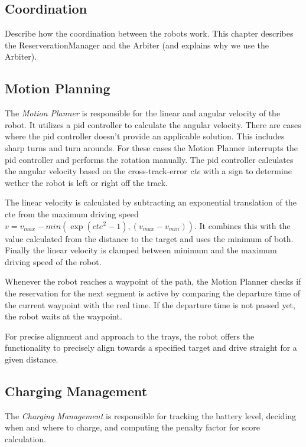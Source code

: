 \documentclass[journal]{IEEEtran}
\begin{document}
\subsection{Coordination}
\label{subsec:coordination}
Describe how the coordination between the robots work. This chapter describes the ReserverationManager and the Arbiter (and explains why we use the Arbiter).

\subsection{Motion Planning}
\label{subsec:motion_planning}
The \emph{Motion Planner} is responsible for the linear and angular velocity of the robot. It utilizes a pid controller to calculate the angular velocity. There are cases where the pid controller doesn't provide an applicable solution. This includes sharp turns and turn arounds. For these cases the Motion Planner interrupts the pid controller and performs the rotation manually. The pid controller calculates the angular velocity based on the cross-track-error \emph{cte} with a sign to determine wether the robot is left or right off the track.

The linear velocity is calculated by subtracting an exponential translation of the cte from the maximum driving speed $v = v_{max} - min(\exp(cte^2-1), (v_{max}-v_{min}))$. It combines this with the value calculated from the distance to the target and uses the minimum of both. Finally the linear velocity is clamped between minimum and the maximum driving speed of the robot.

Whenever the robot reaches a waypoint of the path, the Motion Planner checks if the reservation for the next segment is active by comparing the departure time of the current waypoint with the real time. If the departure time is not passed yet, the robot waits at the waypoint.

For precise alignment and approach to the trays, the robot offers the functionality to precisely align towards a specified target and drive straight for a given distance.

\subsection{Charging Management}
\label{subsec:charging_management}
The \textit{Charging Management} is responsible for tracking the battery level, deciding when and where to charge, and computing the penalty factor for score calculation.
\end{document}
